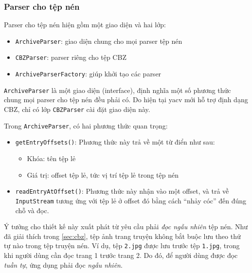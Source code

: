 \documentclass[../../../../thesis]{subfiles}
\begin{document}

\subsubsection{Parser cho tệp nén}

Parser cho tệp nén hiện gồm một giao diện và hai lớp:

\begin{itemize}
    \item
        \texttt{ArchiveParser}: giao diện chung cho mọi parser tệp nén
    \item
        \texttt{CBZParser}: parser riêng cho tệp CBZ
    \item
        \texttt{ArchiveParserFactory}: giúp khởi tạo các parser
\end{itemize}

\texttt{ArchiveParser} là một giao diện (interface), định nghĩa một số phương
thức chung mọi parser cho tệp nén đều phải có. Do hiện tại yacv mới hỗ trợ định
dạng CBZ, chỉ có lớp \texttt{CBZParser} cài đặt giao diện này.

Trong \texttt{ArchiveParser}, có hai phương thức quan trọng:

\begin{itemize}
    \item
        \texttt{getEntryOffsets()}: Phương thức này trả về một từ điển như sau:

        \begin{itemize}
            \item
                Khóa: tên tệp lẻ
            \item
                Giá trị: offset tệp lẻ, tức vị trí tệp lẻ trong tệp nén
        \end{itemize}
    \item
        \texttt{readEntryAtOffset()}: Phương thức này nhận vào một offset, và
        trả về \texttt{InputStream} tương ứng với tệp lẻ ở offset đó bằng cách
        ``nhảy cóc'' đến đúng chỗ và đọc.
\end{itemize}

Ý tưởng cho thiết kế này xuất phát từ yêu cầu phải \emph{đọc ngẫu nhiên} tệp
nén. Như đã giải thích trong \autoref{sec:cbz}, tệp ảnh trang truyện không bắt
buộc lưu theo thứ tự nào trong tệp truyện nén. Ví dụ, tệp \texttt{2.jpg} được
lưu trước tệp \texttt{1.jpg}, trong khi người dùng cần đọc trang 1 trước trang
2. Do đó, để người dùng được đọc \emph{tuần tự}, ứng dụng phải đọc \emph{ngẫu
nhiên}.
\end{document}

